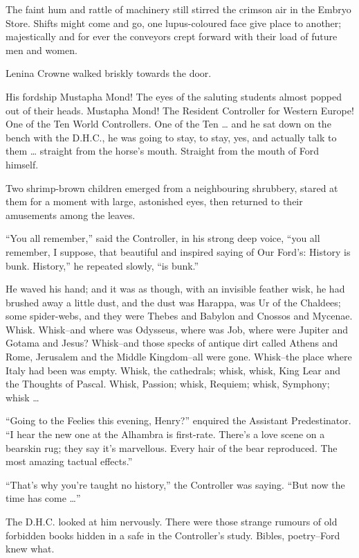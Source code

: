 \documentclass[12pt]{report}
\begin{document}
The faint hum and rattle of machinery still stirred the crimson air in
the Embryo Store. Shifts might come and go, one lupus-coloured face give
place to another; majestically and for ever the conveyors crept forward
with their load of future men and women.

Lenina Crowne walked briskly towards the door.\\
\par
His fordship Mustapha Mond! The eyes of the saluting students almost
popped out of their heads. Mustapha Mond! The Resident Controller for
Western Europe! One of the Ten World Controllers. One of the Ten
\ldots{} and he sat down on the bench with the D.H.C., he was going to
stay, to stay, yes, and actually talk to them \ldots{} straight from the
horse's mouth. Straight from the mouth of Ford himself.

Two shrimp-brown children emerged from a neighbouring shrubbery, stared
at them for a moment with large, astonished eyes, then returned to their
amusements among the leaves.

``You all remember,'' said the Controller, in his strong deep voice,
``you all remember, I suppose, that beautiful and inspired saying of Our
Ford's: History is bunk. History,'' he repeated slowly, ``is bunk.''

He waved his hand; and it was as though, with an invisible feather wisk,
he had brushed away a little dust, and the dust was Harappa, was Ur of
the Chaldees; some spider-webs, and they were Thebes and Babylon and
Cnossos and Mycenae. Whisk. Whisk--and where was Odysseus, where was
Job, where were Jupiter and Gotama and Jesus? Whisk--and those specks of
antique dirt called Athens and Rome, Jerusalem and the Middle
Kingdom--all were gone. Whisk--the place where Italy had been was empty.
Whisk, the cathedrals; whisk, whisk, King Lear and the Thoughts of
Pascal. Whisk, Passion; whisk, Requiem; whisk, Symphony; whisk \ldots{}
\\
\par ``Going to the Feelies this evening, Henry?'' enquired the Assistant
Predestinator. ``I hear the new one at the Alhambra is first-rate.
There's a love scene on a bearskin rug; they say it's marvellous. Every
hair of the bear reproduced. The most amazing tactual effects.''
\\
\par ``That's why you're taught no history,'' the Controller was saying.
``But now the time has come \ldots{}''

The D.H.C. looked at him nervously. There were those strange rumours of
old forbidden books hidden in a safe in the Controller's study. Bibles,
poetry--Ford knew what.
\end{document}
